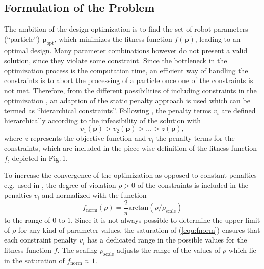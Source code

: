 \documentclass[fleqn,a4paper,10pt]{article}
\newcommand{\bm}[1]{\mathbf{#1}}
\begin{document}
\begin{multicols}{2}
\subsection{Formulation of the Problem}
\label{sec:opt_formulation}

\begin{figure}

\centering

\label{fig:uebersicht}
\end{figure}

The ambition of the design optimization is to find the set of robot parameters (``particle'') $\bm{p}_\mathrm{opt}$, which minimizes the fitness function $f(\bm{p})$, leading to an optimal design.
Many parameter combinations however do not present a valid solution, since they violate some constraint.
Since the bottleneck in the optimization process is the computation time, an efficient way of handling the constraints is to abort the processing of a particle once one of the constraints is not met.
Therefore, from the different possibilities of including constraints in the optimization \cite{Jordehi2015}, an adaption of the static penalty approach is used which can be termed as ``hierarchical constraints''.
Following \cite{Ramirez2018}, the penalty terms $v_i$ are defined hierarchically according to the infeasibility of the solution with
%
\begin{equation}
v_1(\bm{p})>v_2(\bm{p})>\dots>z(\bm{p}),
\end{equation}
%
where $z$ represents the objective function and $v_i$ the penalty terms for the constraints, which are included in the piece-wise definition of the fitness function $f$, depicted in Fig.\,\ref{fig:uebersicht}.

To increase the convergence of the optimization as opposed to  constant penalties e.g. used in \cite{Ramirez2018}, the degree of violation $\rho>0$ of the constraints is included in the penalties $v_i$ and normalized with the function
%
\begin{equation}
f_\mathrm{norm}(\rho) = \frac{2}{\pi} \mathrm{arctan}(\rho / \rho_{\mathrm{scale}})
\label{equ:fnorm}
\end{equation}
%
to the range of $0$ to $1$.
Since it is not always possible to determine the upper limit of $\rho$ for any kind of parameter values, the saturation of (\ref{equ:fnorm}) ensures that each constraint penalty $v_i$ has a dedicated range in the possible values for the fitness function $f$.
The scaling $\rho_{\mathrm{scale}}$ adjusts the range of the values of $\rho$ which lie in the saturation of $f_\mathrm{norm} \approx 1$.



\end{multicols}
\end{document}
